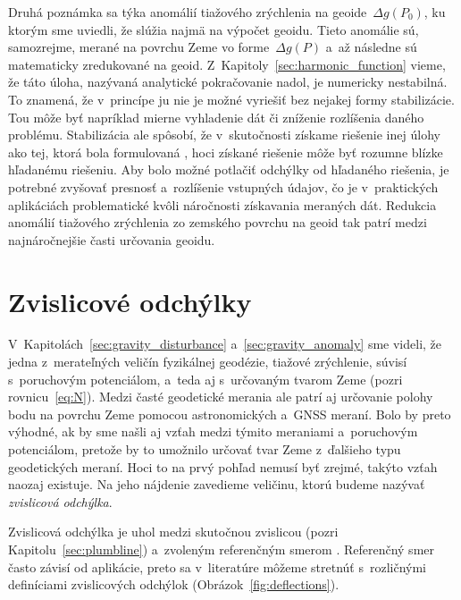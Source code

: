 \documentclass[a4paper, 12pt]{book}
\begin{document}
Druhá poznámka sa týka anomálií tiažového zrýchlenia na geoide~$\Delta g(P_0)$, 
ku ktorým sme uviedli, že slúžia najmä na výpočet geoidu.  Tieto anomálie sú, 
samozrejme, merané na povrchu Zeme vo forme~$\Delta g(P)$ a~až následne sú 
matematicky zredukované na geoid.  Z~Kapitoly~\ref{sec:harmonic_function} 
vieme, že táto úloha, nazývaná analytické pokračovanie nadol, je numericky 
nestabilná.  To znamená, že v~princípe ju nie je možné vyriešiť bez nejakej 
formy stabilizácie.  Tou môže byť napríklad mierne vyhladenie dát či zníženie 
rozlíšenia daného problému.  Stabilizácia ale spôsobí, že v~skutočnosti získame 
riešenie inej úlohy ako tej, ktorá bola formulovaná 
\parencite{SansoGeodeticBoundaryValueProblem}, hoci získané riešenie môže byť 
rozumne blízke hľadanému riešeniu.  Aby bolo možné potlačiť odchýlky od 
hľadaného riešenia, je potrebné zvyšovať presnosť a~rozlíšenie vstupných 
údajov, čo je v~praktických aplikáciách problematické kvôli náročnosti 
získavania meraných dát.  Redukcia anomálií tiažového zrýchlenia zo zemského 
povrchu na geoid tak patrí medzi najnáročnejšie časti určovania geoidu.






\section{Zvislicové odchýlky}
\label{sec:deflections}

V~Kapitolách~\ref{sec:gravity_disturbance} a~\ref{sec:gravity_anomaly} sme 
videli, že jedna z~merateľných veličín fyzikálnej geodézie, tiažové zrýchlenie, 
súvisí s~poruchovým potenciálom, a~teda aj s~určovaným tvarom Zeme (pozri 
rovnicu~\ref{eq:N}).  Medzi časté geodetické merania ale patrí aj určovanie 
polohy bodu na povrchu Zeme pomocou astronomických a~GNSS meraní.  Bolo by 
preto výhodné, ak by sme našli aj vzťah medzi týmito meraniami a~poruchovým 
potenciálom, pretože by to umožnilo určovať tvar Zeme z~ďalšieho typu 
geodetických meraní.  Hoci to na prvý pohľad nemusí byť zrejmé, takýto vzťah 
naozaj existuje.  Na jeho nájdenie zavedieme veličinu, ktorú budeme nazývať 
\emph{zvislicová odchýlka}.

Zvislicová odchýlka je uhol medzi skutočnou zvislicou (pozri 
Kapitolu~\ref{sec:plumbline}) a~zvoleným referenčným smerom 
\parencite{TorgeGeodesy}.  Referenčný smer často závisí od aplikácie, preto sa 
v~literatúre môžeme stretnúť s~rozličnými definíciami zvislicových odchýlok 
(Obrázok~\ref{fig:deflections}).
\end{document}
